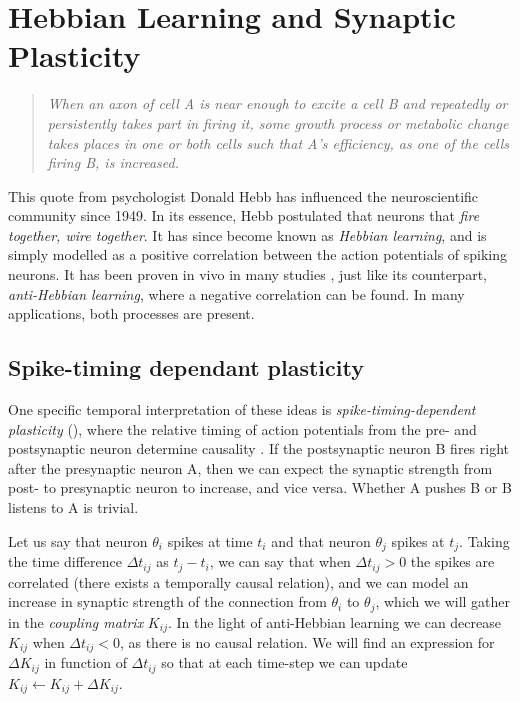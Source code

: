 \newpage
\section{\theory Hebbian Learning and Synaptic Plasticity} \label{sec:HebbianLearningAndSynapticPlasticity}
\vspace{1mm}
\begin{quote}
\textsl{When an axon of cell A is near enough to excite a cell B and repeatedly or persistently takes part in firing it, some growth process or metabolic change takes places in one or both cells such that A's efficiency, as one of the cells firing B, is increased.}\cite{Hebb1949}
\end{quote}

This quote from psychologist Donald Hebb has influenced the neuroscientific community since 1949. In its essence, Hebb postulated that neurons that \textsl{fire together, wire together}. It has since become known as \textsl{Hebbian learning}, and is simply modelled as a positive correlation between the action potentials of spiking neurons. It has been proven in vivo in many studies \cite{ChrolCannon2014}, just like its counterpart, \textsl{anti-Hebbian learning}, where a negative correlation can be found. In many applications, both processes are present. 


\subsection{Spike-timing dependant plasticity}
One specific temporal interpretation of these ideas is \textsl{spike-timing-dependent plasticity} (\STDP), where the relative timing of action potentials from the pre- and postsynaptic neuron determine causality \cite{Kempter1999, Gerstner2002}. If the postsynaptic neuron B fires right after the presynaptic neuron A, then we can expect the synaptic strength from post- to presynaptic neuron to increase, and vice versa. Whether A pushes B or B listens to A  is trivial.

Let us say that neuron $\theta_i$ spikes at time $t_i$ and that neuron $\theta_j$ spikes at $t_j$. Taking the time difference $\Delta t_{ij}$ as $t_j - t_i$, we can say that when $\Delta t_{ij} > 0$ the spikes are correlated (there exists a temporally causal relation), and we can model an increase in synaptic strength of the connection from $\theta_i$ to $\theta_j$, which we will gather in the \textsl{coupling matrix} $K_{ij}$. In the light of anti-Hebbian learning we can decrease $K_{ij}$ when $\Delta t_{ij} < 0$, as there is no causal relation. We will find an expression for $\Delta K_{ij}$ in function of $\Delta t_{ij}$ so that at each time-step we can update $K_{ij} \leftarrow K_{ij} + \Delta K_{ij}$.\\

